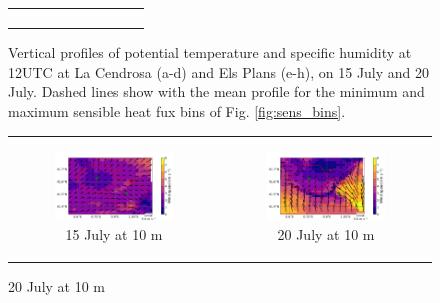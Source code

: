 \begin{figure}[hbtp]
{\begin{tabular}{@{}cccc@{}}
\begin{subfigure}[t]{0.29\textwidth}
        \end{subfigure} \\
    \end{tabular}
    }
    \caption{Vertical profiles of potential temperature and specific humidity at 12UTC at La Cendrosa (a-d) and Els Plans (e-h), on 15 July and 20 July. Dashed lines show with the mean profile for the minimum and maximum sensible heat fux bins of Fig. \ref{fig:sens_bins}.}
    \label{fig:profiles_theta_ovap_sensbins}
\end{figure}

\begin{figure}[hbtp]
    \centering
    \begin{tabular}{cc}
        \begin{subfigure}[t]{0.5\textwidth}
            \caption{15 July at 10 m}
            \includegraphics[width=\textwidth]{images/chap5/IOP_maps/mesoNH_wind_10m_2021-07-15T12:00:00.png}
        \end{subfigure} &
        \begin{subfigure}[t]{0.5\textwidth}
            \caption{20 July at 10 m}
            \includegraphics[width=\textwidth]{images/chap5/IOP_maps/mesoNH_wind_10m_2021-07-20T12:00:00.png}

\end{subfigure}
\end{tabular}
\end{figure}

